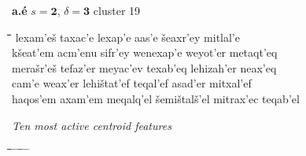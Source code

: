\begin{figure}[htb]
\begin{mdframed}
\vspace{2pt}
{\LARGE\textbf{a.\'{e}}} \hfill {\large$s = \mathbf{2}$, $\delta = \mathbf{3}$} \hfill {\normalsize cluster 19}
\vspace{3pt}
\begin{normalsize}
\begin{tabbing}
\hspace*{14ex}\= \hspace*{14ex}\=\hspace*{14ex}\=\hspace*{14ex}\=\hspace*{14ex}\=\hspace*{14ex} \kill
lexam\a'{e}\v{s} \> taxac\a'{e} \> lexap\a'{e} \> aas\a'{e} \> \v{s}eaxr\a'{e}y \> mitlal\a'{e} \\
k\v{s}eat\a'{e}m \> acm\a'{e}nu \> sifr\a'{e}y \> wenexap\a'{e} \> weyot\a'{e}r \> metaqt\a'{e}q \\
mera\v{s}r\a'{e}\v{s} \> tefaz\a'{e}r \> meyac\a'{e}v \> texab\a'{e}q \> lehizah\a'{e}r \> neax\a'{e}q \\
cam\a'{e} \> weax\a'{e}r \> lehi\v{s}tat\a'{e}f \> teqal\a'{e}f \> asad\a'{e}r \> mitxal\a'{e}f \\
haqos\a'{e}m \> axam\a'{e}m \> meqalq\a'{e}l \> \v{s}emi\v{s}tal\v{s}\a'{e}l \> mitrax\a'{e}c \> teqab\a'{e}l
\end{tabbing}
\end{normalsize}
\vspace{-3pt}
\begin{mdframed}
\begin{small}
\textit{Ten most active centroid features}
\vspace{-3pt}
\begin{tabbing}
\hspace*{6.5ex}\= \hspace*{11ex}\= \hspace*{6.5ex}\= \hspace*{11ex} \= \hspace*{6.5ex} \= \hspace*{11ex} \= \hspace*{6.5ex}\= \hspace*{11ex} \= \hspace*{6.5ex} \= \hspace*{11ex}\kill

\end{tabbing}
\end{small}
\end{mdframed}
\end{mdframed}
\end{figure}
